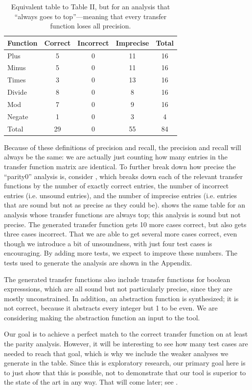 \documentclass[10pt,conference]{IEEEtran}
\begin{document}
\begin{table}
\centering
 \begin{tabular}{l c c c c }
  
  Function & Correct & Incorrect & Imprecise & Total\\ 
  \midrule
  Plus & 5 & 0 & 11 & 16 \\
  Minus & 5 & 0 & 11 & 16 \\
  Times & 3 & 0 & 13 & 16 \\
  Divide & 8 & 0 & 8 & 16 \\
  Mod & 7 & 0 & 9 & 16 \\
  Negate & 1 & 0 & 3 & 4 \\
  \midrule
  Total & 29 & 0 & 55 & 84 \\
 \end{tabular}
 \caption{Equivalent table to Table II, but for an
 analysis that ``always goes to top''---meaning that every
 transfer function loses all precision.}
 \label{tab-top}
\end{table}

Because of these definitions of precision and recall, the
precision and recall will always be the same: we are actually just counting how
many entries in the transfer function matrix are identical. To further break
down how precise the ``parity0'' analysis is, consider , which breaks
down each of the relevant transfer functions by the number of exactly correct
entries, the number of incorrect entries (i.e. unsound entries), and the
number of imprecise entries (i.e. entries that are sound but not as precise
as they could be).  shows the same table for an analysis whose
transfer functions are always top; this analysis is sound but not precise.
The generated transfer function gets 10 more cases correct, but also gets
three cases incorrect. That we are able to get several more cases correct,
even though we introduce a bit of unsoundness, with just four test cases
is encouraging. By adding more tests, we expect to improve these numbers.
The tests used to generate the analysis are shown in the Appendix.

The generated transfer functions also include transfer functions for
boolean expresssions, which are all sound but not particularly precise,
since they are mostly unconstrained. In addition, an abstraction function
is synthesized; it is not correct, because it abstracts every integer but 1
to be even. We are considering making the abstraction function an input to
the tool.

Our goal is to achieve a perfect match to the correct transfer function
on at least the parity analysis.
However, it will be interesting to see how many test cases are needed to
reach that goal, which is why we include the weaker analyses we generate
in the table. Since this is exploratory research, our primary goal here
is to just show that this is possible, not to demonstrate that our tool
is superior to the state of the art in any way. That will come later;
see .
\end{document}
